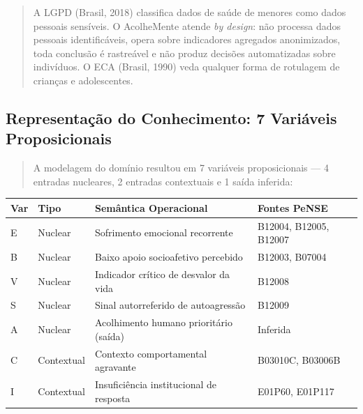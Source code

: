\documentclass[11pt]{article}
\begin{document}
\begin{quote}
A LGPD (Brasil, 2018) classifica dados de saúde de menores como dados
pessoais sensíveis. O AcolheMente atende \emph{by design}: não processa
dados pessoais identificáveis, opera sobre indicadores agregados
anonimizados, toda conclusão é rastreável e não produz decisões
automatizadas sobre indivíduos. O ECA (Brasil, 1990) veda qualquer forma
de rotulagem de crianças e adolescentes.
\end{quote}

\subsection{Representação do Conhecimento: 7 Variáveis
Proposicionais}\label{representauxe7uxe3o-do-conhecimento-7-variuxe1veis-proposicionais}

\begin{quote}
A modelagem do domínio resultou em 7 variáveis proposicionais --- 4
entradas nucleares, 2 entradas contextuais e 1 saída inferida:
\end{quote}

{\def\LTcaptype{none} %
\begin{longtable}[]{@{}
  >{\raggedright\arraybackslash}p{}
  >{\raggedright\arraybackslash}p{}
  >{\raggedright\arraybackslash}p{}
  >{\raggedright\arraybackslash}p{}@{}}
\toprule\noalign{}
\begin{minipage}[b]{\linewidth}\raggedright
Var
\end{minipage} & \begin{minipage}[b]{\linewidth}\raggedright
Tipo
\end{minipage} & \begin{minipage}[b]{\linewidth}\raggedright
Semântica Operacional
\end{minipage} & \begin{minipage}[b]{\linewidth}\raggedright
Fontes PeNSE
\end{minipage} \\
\midrule\noalign{}
\endhead
\bottomrule\noalign{}
\endlastfoot
E & Nuclear & Sofrimento emocional recorrente & B12004, B12005,
B12007 \\
B & Nuclear & Baixo apoio socioafetivo percebido & B12003, B07004 \\
V & Nuclear & Indicador crítico de desvalor da vida & B12008 \\
S & Nuclear & Sinal autorreferido de autoagressão & B12009 \\
A & Nuclear & Acolhimento humano prioritário (saída) & Inferida \\
C & Contextual & Contexto comportamental agravante & B03010C, B03006B \\
I & Contextual & Insuficiência institucional de resposta & E01P60,
E01P117 \\
\end{longtable}
}
\end{document}
